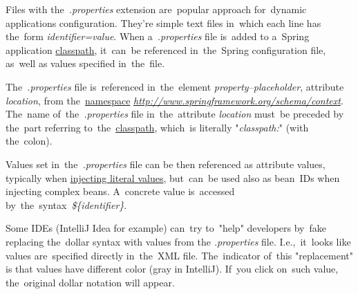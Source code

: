 Files with the~\textit{.properties} extension are~popular approach for~dynamic applications configuration. They're simple text files in~which each line has the~form \textit{identifier=value}. When a~\textit{.properties} file is~added to a~Spring application \hyperref[classpath]{classpath}, it~can~be referenced in~the~Spring configuration file, as~well as values specified in~the~file.

The~\textit{.properties} file is~referenced in~the~element \textit{property--placeholder}, attribute \textit{location}, from the~\hyperref[namespaces]{namespace} \textit{\href{http://www.springframework.org/schema/context}{http://www.springframework.org/schema/context}}. The~name of~the~\textit{.properties} file in~the~attribute \textit{location} must~be preceded by the~part referring to~the~\hyperref[classpath]{classpath}, which~is literally "\textit{classpath:}" (with the~colon).

Values set in~the~\textit{.properties} file can be then referenced as attribute values, typically when \hyperref[injectingliteralvalues]{injecting literal values}, but~can~be used also as bean~IDs when injecting complex beans. A~concrete value is~accessed by~the~syntax~\textit{\$\{identifier\}}.

\newline\warning Some IDEs (IntelliJ Idea for example) can~try to~"help" developers by~fake replacing the~dollar syntax with values from the \textit{.properties} file. I.e.,~it~looks like values are~specified directly in~the~XML file. The~indicator of~this "replacement" is that values have different color (gray in IntelliJ). If~you click on~such value, the~original dollar notation will appear.\\

